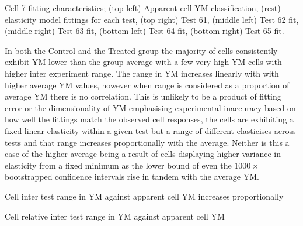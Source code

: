 \documentclass[
  paper=a4,
  ,captions=tableheading
]{scrartcl}
\makeatletter
\newcommand*\pandocbounded[1]{%
  \sbox\pandoc@box{#1}%
  \Gscale@div\@tempa{\textheight}{\dimexpr\ht\pandoc@box+\dp\pandoc@box\relax}%
  \Gscale@div\@tempb{\linewidth}{\wd\pandoc@box}%
  \ifdim\@tempb\p@<\@tempa\p@\let\@tempa\@tempb\fi%
  \ifdim\@tempa\p@<\p@\scalebox{\@tempa}{\usebox\pandoc@box}%
  \else\usebox{\pandoc@box}%
  \fi%
}
\renewenvironment{quote}{\begin{customblockquote}\list{}{\rightmargin=0em\leftmargin=0em}%
\item\relax\color{blockquote-text}\ignorespaces}{\unskip\unskip\endlist\end{customblockquote}}
\makeatother
\begin{document}
\noindent
\begin{minipage}[t]{0.48\textwidth}

\end{minipage}
\hfill
\begin{minipage}[t]{0.48\textwidth}

\end{minipage}

\begin{quote}
Cell 7 fitting characteristics; (top left) Apparent cell YM
classification, (rest) elasticity model fittings for each test, (top
right) Test 61, (middle left) Test 62 fit, (middle right) Test 63 fit,
(bottom left) Test 64 fit, (bottom right) Test 65 fit.
\end{quote}

In both the Control and the Treated group the majority of cells
consistently exhibit YM lower than the group average with a few very
high YM cells with higher inter experiment range. The range in YM
increases linearly with with higher average YM values, however when
range is considered as a proportion of average YM there is no
correlation. This is unlikely to be a product of fitting error or the
dimensionality of YM emphasising experimental inaccuracy based on how
well the fittings match the observed cell responses, the cells are
exhibiting a fixed linear elasticity within a given test but a range of
different elasticises across tests and that range increases
proportionally with the average. Neither is this a case of the higher
average being a result of cells displaying higher variance in elasticity
from a fixed minimum as the lower bound of even the \(1000\times\)
bootstrapped confidence intervals rise in tandem with the average YM.

\noindent
\begin{minipage}[t]{0.48\textwidth}
\begin{quote}
\pandocbounded{}
Cell inter test range in YM against apparent cell YM increases
proportionally
\end{quote}
\end{minipage}
\hfill
\begin{minipage}[t]{0.48\textwidth}
\begin{quote}
\pandocbounded{}
Cell relative inter test range in YM against apparent cell YM
\end{quote}
\end{minipage}
\end{document}
